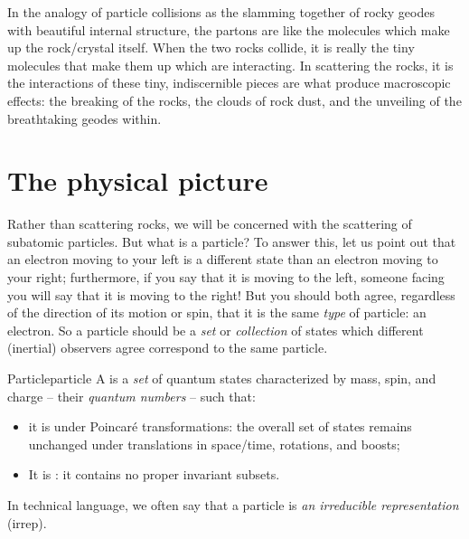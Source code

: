 In the analogy of particle collisions as the slamming together of rocky geodes with beautiful internal structure, the partons are like the molecules which make up the rock/crystal itself.
%
When the two rocks collide, it is really the tiny molecules that make them up which are interacting.
%
In scattering the rocks, it is the interactions of these tiny, indiscernible pieces are what produce macroscopic effects:
%
the breaking of the rocks, the clouds of rock dust, and the unveiling of the breathtaking geodes within.


\section{The physical picture}


Rather than scattering rocks, we will be concerned with the scattering of subatomic particles.
%
But what is a particle?
%
To answer this, let us point out that an electron moving to your left is a different state than an electron moving to your right;
%
furthermore, if you say that it is moving to the left, someone facing you will say that it is moving to the right!
%
But you should both agree, regardless of the direction of its motion or spin, that it is the same \textit{type} of particle:
%
an electron.
%
So a particle should be a \textit{set} or \textit{collection} of states which different (inertial) observers agree correspond to the same particle.

\begin{definitionbox}{Particle}{particle}
    A  is a \textit{set} of quantum states characterized by mass, spin, and charge -- their \textit{quantum numbers} -- such that:
    \begin{itemize}
        \item
            it is  under Poincar\'e transformations:
            the overall set of states remains unchanged under translations in space/time, rotations, and boosts;


        \item
            It is :
            it contains no proper invariant subsets.
    \end{itemize}
    In technical language, we often say that a particle is \textit{an irreducible representation} (irrep).
\end{definitionbox}


